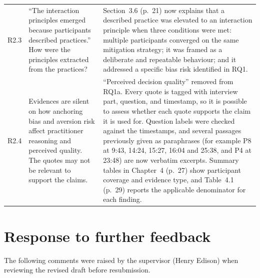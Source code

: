 \documentclass[12pt,a4paper,twoside]{article}
\begin{document}
{\begin{longtable}{p{1cm}p{6.7cm}p{7cm}}
R2.3 &
``The interaction principles emerged because participants described practices.'' How
were the principles extracted from the practices? &
Section~3.6 (p.~21) now explains that a described practice was elevated to an interaction
principle when three conditions were met: multiple participants converged on the same
mitigation strategy; it was framed as a deliberate and repeatable behaviour; and it
addressed a specific bias risk identified in RQ1. \\

R2.4 &
Evidences are silent on how anchoring bias and aversion risk affect practitioner
reasoning and perceived quality. The quotes may not be relevant to support the claims. &
``Perceived decision quality'' removed from RQ1a. Every quote is tagged with interview part, question, and timestamp, so it is possible to assess whether each quote supports the claim it is used for. Question labels were checked against the timestamps, and several passages previously given as paraphrases (for example P8 at 9:43, 14:24, 15:27, 16:04 and 25:38, and P4 at 23:48) are now verbatim excerpts. Summary tables in Chapter~4 (p.~27) show participant coverage and evidence type, and Table~4.1 (p.~29) reports the applicable denominator for each finding. \\

\end{longtable}
}


\section{Response to further feedback}

The following comments were raised by the supervisor (Henry Edison) when reviewing
the revised draft before resubmission.
\end{document}
